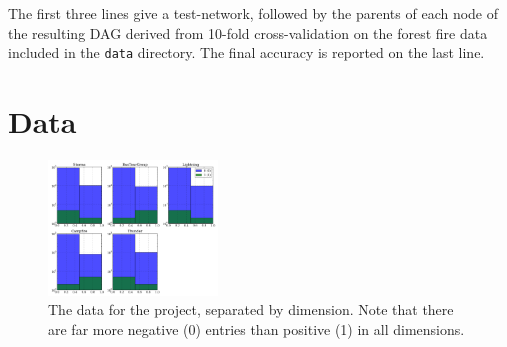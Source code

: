 The first three lines give a test-network, followed by the parents of each node of the resulting DAG derived from 10-fold cross-validation on the forest fire data included in the \texttt{data} directory.  The final accuracy is reported on the last line.

\section{Data}

\begin{figure}[H]
  \centering
		\includegraphics[width=0.4\textwidth]{images/data.png}
  \caption{The data for the project, separated by dimension.  Note that there are far more negative (0) entries than positive (1) in all dimensions.}
\end{figure}
 






